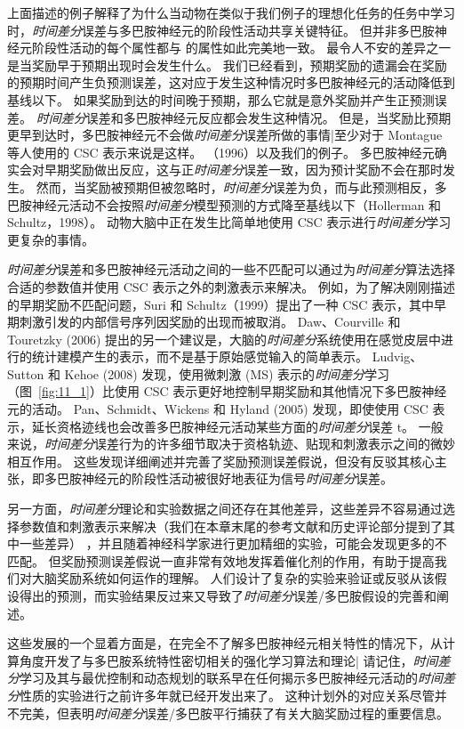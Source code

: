 上面描述的例子解释了为什么当动物在类似于我们例子的理想化任务的任务中学习时，\textit{时间差分}误差与多巴胺神经元的阶段性活动共享关键特征。
但并非多巴胺神经元阶段性活动的每个属性都与 的属性如此完美地一致。
最令人不安的差异之一是当奖励早于预期出现时会发生什么。
我们已经看到，预期奖励的遗漏会在奖励的预期时间产生负预测误差，这对应于发生这种情况时多巴胺神经元的活动降低到基线以下。
如果奖励到达的时间晚于预期，那么它就是意外奖励并产生正预测误差。
\textit{时间差分}误差和多巴胺神经元反应都会发生这种情况。
但是，当奖励比预期更早到达时，多巴胺神经元不会做\textit{时间差分}误差所做的事情|至少对于 Montague 等人使用的 CSC 表示来说是这样。 （1996）以及我们的例子。
多巴胺神经元确实会对早期奖励做出反应，这与正\textit{时间差分}误差一致，因为预计奖励不会在那时发生。
然而，当奖励被预期但被忽略时，\textit{时间差分}误差为负，而与此预测相反，多巴胺神经元活动不会按照\textit{时间差分}模型预测的方式降至基线以下（Hollerman 和 Schultz，1998）。
动物大脑中正在发生比简单地使用 CSC 表示进行\textit{时间差分}学习更复杂的事情。



\textit{时间差分}误差和多巴胺神经元活动之间的一些不匹配可以通过为\textit{时间差分}算法选择合适的参数值并使用 CSC 表示之外的刺激表示来解决。
例如，为了解决刚刚描述的早期奖励不匹配问题，Suri 和 Schultz（1999）提出了一种 CSC 表示，其中早期刺激引发的内部信号序列因奖励的出现而被取消。
Daw、Courville 和 Touretzky (2006) 提出的另一个建议是，大脑的\textit{时间差分}系统使用在感觉皮层中进行的统计建模产生的表示，而不是基于原始感觉输入的简单表示。
Ludvig、Sutton 和 Kehoe (2008) 发现，使用微刺激 (MS) 表示的\textit{时间差分}学习（图~\ref{fig:11_1}）比使用 CSC 表示更好地控制早期奖励和其他情况下多巴胺神经元的活动。
Pan、Schmidt、Wickens 和 Hyland (2005) 发现，即使使用 CSC 表示，延长资格迹线也会改善多巴胺神经元活动某些方面的\textit{时间差分}误差 t。
一般来说，\textit{时间差分}误差行为的许多细节取决于资格轨迹、贴现和刺激表示之间的微妙相互作用。
这些发现详细阐述并完善了奖励预测误差假说，但没有反驳其核心主张，即多巴胺神经元的阶段性活动被很好地表征为信号\textit{时间差分}误差。


另一方面，\textit{时间差分}理论和实验数据之间还存在其他差异，这些差异不容易通过选择参数值和刺激表示来解决（我们在本章末尾的参考文献和历史评论部分提到了其中一些差异） ，并且随着神经科学家进行更加精细的实验，可能会发现更多的不匹配。
但奖励预测误差假说一直非常有效地发挥着催化剂的作用，有助于提高我们对大脑奖励系统如何运作的理解。
人们设计了复杂的实验来验证或反驳从该假设得出的预测，而实验结果反过来又导致了\textit{时间差分}误差/多巴胺假设的完善和阐述。


这些发展的一个显着方面是，在完全不了解多巴胺神经元相关特性的情况下，从计算角度开发了与多巴胺系统特性密切相关的强化学习算法和理论| 请记住，\textit{时间差分}学习及其与最优控制和动态规划的联系早在任何揭示多巴胺神经元活动的\textit{时间差分}性质的实验进行之前许多年就已经开发出来了。
这种计划外的对应关系尽管并不完美，但表明\textit{时间差分}误差/多巴胺平行捕获了有关大脑奖励过程的重要信息。


